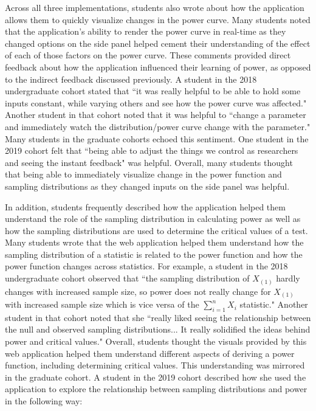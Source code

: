 \documentclass{TISE}
\begin{document}
Across all three implementations, students also wrote about how the application allows them to quickly visualize changes in the power curve. Many students noted that the application's ability to render the power curve in real-time as they changed options on the side panel helped cement their understanding of the effect of each of those factors on the power curve. These comments provided direct feedback about how the application influenced their learning of power, as opposed to the indirect feedback discussed previously. A student in the 2018 undergraduate cohort stated that ``it was really helpful to be able to hold some inputs constant, while varying others and see how the power curve was affected." Another student in that cohort noted that it was helpful to ``change a parameter and immediately watch the distribution/power curve change with the parameter." Many students in the graduate cohorts echoed this sentiment. One student in the 2019 cohort felt that ``being able to adjust the things we control as researchers and seeing the instant feedback" was helpful. Overall, many students thought that being able to immediately visualize change in the power function and sampling distributions as they changed inputs on the side panel was helpful. 

In addition, students frequently described how the application helped them understand the role of the sampling distribution in calculating power as well as how the sampling distributions are used to determine the critical values of a test. Many students wrote that the web application helped them understand how the sampling distribution of a statistic is related to the power function and how the power function changes across statistics. For example, a student in the 2018 undergraduate cohort observed that ``the sampling distribution of $X_{(1)}$ hardly changes with increased sample size, so power does not really change for $X_{(1)}$ with increased sample size which is vice versa of the $\sum_{i=1}^n X_i$ statistic." Another student in that cohort noted that she ``really liked seeing the relationship between the null and observed sampling distributions... It really solidified the ideas behind power and critical values." Overall, students thought the visuals provided by this web application helped them understand different aspects of deriving a power function, including determining critical values. This understanding was mirrored in the graduate cohort. A student in the 2019 cohort described how she used the application to explore the relationship between sampling distributions and power in the following way:
\end{document}
